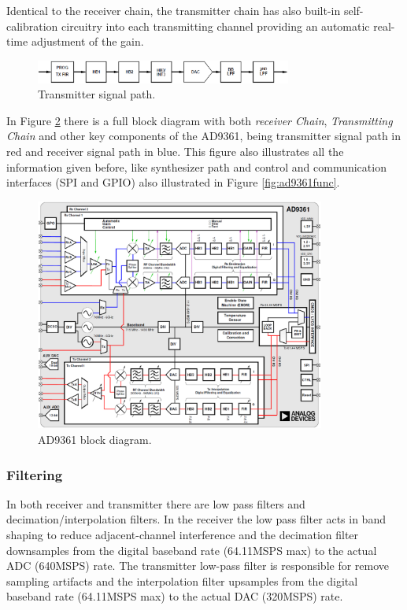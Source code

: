 Identical to the receiver chain, the transmitter chain has also built-in
self-calibration circuitry into each transmitting channel providing an automatic
real-time adjustment of the gain.

\begin{figure}[htbp]
    \centering
    \includegraphics[width=0.75\textwidth]{./figures/tx_chain}
    \caption{ Transmitter signal path.
    \label{fig:txchain}}
\end{figure}

In Figure \ref{fig:ad9361blk} there is a full block diagram with both
\textit{receiver Chain}, \textit{Transmitting Chain} and other key components of
the AD9361, being transmitter signal path in red and receiver signal path in blue. This figure
also illustrates all the information given before, like synthesizer path and
control and communication interfaces (SPI and GPIO) also illustrated in Figure
\ref{fig:ad9361func}.

\begin{figure}[htbp]
    \centering
    \includegraphics[width=0.85\textwidth]{./figures/ad9361_block_diagram}
    \caption{ AD9361 block diagram.
    \label{fig:ad9361blk}}
\end{figure}

\subsubsection{Filtering}

In both receiver and transmitter there are low pass filters and
decimation/interpolation filters. In the receiver the low pass filter acts in
band shaping to reduce adjacent-channel interference and the decimation filter
downsamples from the digital baseband rate (64.11MSPS max) to the actual ADC
(640MSPS) rate. The transmitter low-pass filter is responsible for remove
sampling artifacts and the interpolation filter upsamples from the digital
baseband rate (64.11MSPS max) to the actual DAC (320MSPS) rate.

